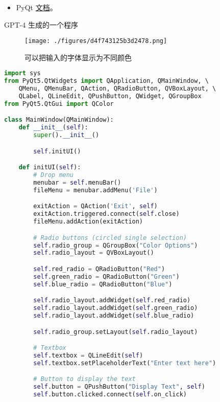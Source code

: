 
\begin{issues}
\issueDraft
\end{issues}

\begin{itemize}
\item PyQt \href{https://www.riverbankcomputing.com/static/Docs/PyQt5/}{文档}。
\end{itemize}


GPT-4 生成的一个程序
\begin{figure}[ht]
\centering
\texttt{[image: ./figures/d4f743125b3d2478.png]}
\caption{可以把输入的字体显示为不同颜色} \label{fig_PyQt_1}
\end{figure}


\begin{lstlisting}[language=python]
import sys
from PyQt5.QtWidgets import QApplication, QMainWindow, \ 
    QMenu, QMenuBar, QAction, QRadioButton, QVBoxLayout, \ 
    QLabel, QLineEdit, QPushButton, QWidget, QGroupBox
from PyQt5.QtGui import QColor

class MainWindow(QMainWindow):
    def __init__(self):
        super().__init__()

        self.initUI()

    def initUI(self):
        # Drop menu
        menubar = self.menuBar()
        fileMenu = menubar.addMenu('File')

        exitAction = QAction('Exit', self)
        exitAction.triggered.connect(self.close)
        fileMenu.addAction(exitAction)

        # Radio buttons (circled single selection)
        self.radio_group = QGroupBox("Color Options")
        self.radio_layout = QVBoxLayout()

        self.red_radio = QRadioButton("Red")
        self.green_radio = QRadioButton("Green")
        self.blue_radio = QRadioButton("Blue")

        self.radio_layout.addWidget(self.red_radio)
        self.radio_layout.addWidget(self.green_radio)
        self.radio_layout.addWidget(self.blue_radio)

        self.radio_group.setLayout(self.radio_layout)

        # Textbox
        self.textbox = QLineEdit(self)
        self.textbox.setPlaceholderText("Enter text here")

        # Button to display the text
        self.button = QPushButton("Display Text", self)
        self.button.clicked.connect(self.on_click)


\end{lstlisting}
